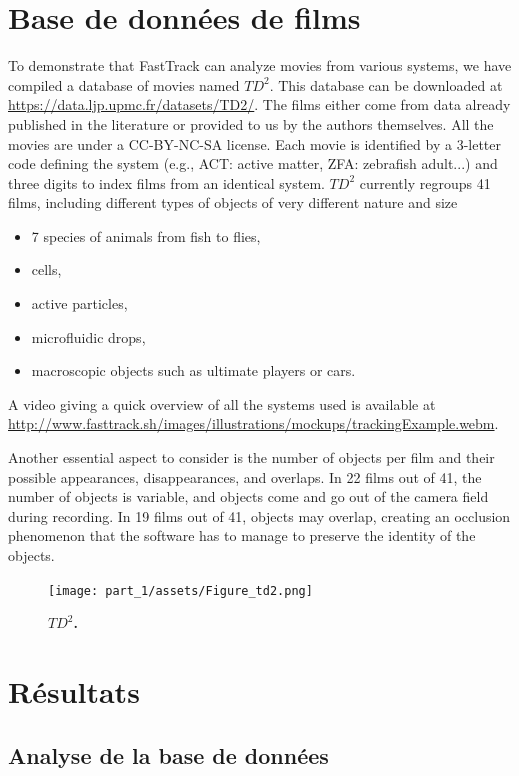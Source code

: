 \chapter{Base de données de films}
    To demonstrate that FastTrack can analyze movies from various systems, we have compiled a database of movies named $TD^2$. This database can be downloaded at \url{https://data.ljp.upmc.fr/datasets/TD2/}. The films either come from data already published in the literature or provided to us by the authors themselves. All the movies are under a CC-BY-NC-SA license. Each movie is identified by a 3-letter code defining the system (e.g., ACT: active matter, ZFA: zebrafish adult...) and three digits to index films from an identical system. $TD^2$ currently regroups 41 films, including different types of objects of very different nature and size
    \begin{itemize}
    \item 7 species of animals from fish to flies,
    \item cells,
    \item active particles,
    \item microfluidic drops,
    \item macroscopic objects such as ultimate players or cars.
    \end{itemize}
    A video giving a quick overview of all the systems used is available at \url{http://www.fasttrack.sh/images/illustrations/mockups/trackingExample.webm}.

    Another essential aspect to consider is the number of objects per film and their possible appearances, disappearances, and overlaps. In 22 films out of 41, the number of objects is variable, and objects come and go out of the camera field during recording. In 19 films out of 41, objects may overlap, creating an occlusion phenomenon that the software has to manage to preserve the identity of the objects.

	\begin{figure}[h]
    \centering
    \texttt{[image: part\_1/assets/Figure\_td2.png]}    
    \caption{\textbf{$TD^2$.}}
    \label{part_1:fig_5}
    \end{figure}


\chapter{Résultats}

	\section{Analyse de la base de données}

